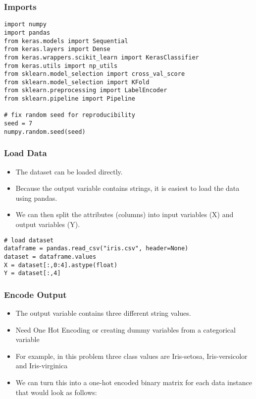 \begin{frame}[fragile] \frametitle{Imports}
\begin{lstlisting}
import numpy
import pandas
from keras.models import Sequential
from keras.layers import Dense
from keras.wrappers.scikit_learn import KerasClassifier
from keras.utils import np_utils
from sklearn.model_selection import cross_val_score
from sklearn.model_selection import KFold
from sklearn.preprocessing import LabelEncoder
from sklearn.pipeline import Pipeline

# fix random seed for reproducibility
seed = 7
numpy.random.seed(seed)
\end{lstlisting}
\end{frame}

\begin{frame}[fragile] \frametitle{Load Data}
 \begin{itemize}
 \item  The dataset can be loaded directly. 
 \item Because the output variable contains strings, it is easiest to load the data using pandas. 
 \item We can then split the attributes (columns) into input variables (X) and output variables (Y).
 \end{itemize}
\begin{lstlisting}
# load dataset
dataframe = pandas.read_csv("iris.csv", header=None)
dataset = dataframe.values
X = dataset[:,0:4].astype(float)
Y = dataset[:,4]
\end{lstlisting}
\end{frame}

\begin{frame}[fragile] \frametitle{ Encode Output}
 \begin{itemize}
 \item  The output variable contains three different string values.
 \item Need One Hot Encoding or creating dummy variables from a categorical variable
 \item For example, in this problem three class values are Iris-setosa, Iris-versicolor and Iris-virginica
 \item We can turn this into a one-hot encoded binary matrix for each data instance that would look as follows:
 \end{itemize}
\end{frame}

